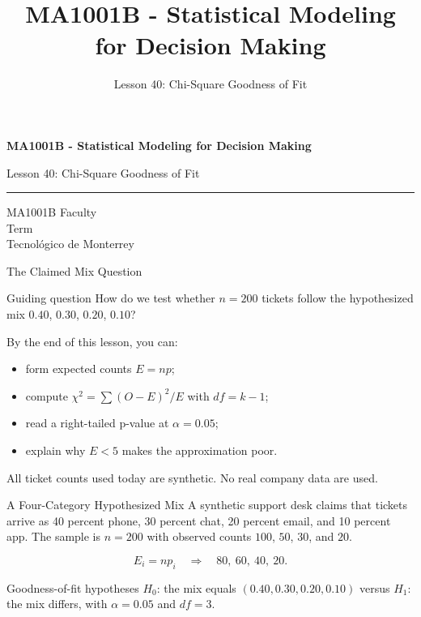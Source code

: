 \documentclass[aspectratio=169,10pt,english]{beamer}
\title{MA1001B - Statistical Modeling for Decision Making}
\subtitle{Lesson 40: Chi-Square Goodness of Fit}
\author{}
\institute{Tecnol\'ogico de Monterrey}
\date{}
\begin{document}
\begin{frame}[plain]
  \vspace{1.2cm}
  {\Large\bfseries MA1001B - Statistical Modeling for Decision Making\par}
  \vspace{0.7cm}
  {\large Lesson 40: Chi-Square Goodness of Fit\par}
  \vspace{0.7cm}
  {\color{TecRojo}\rule{\textwidth}{1.2pt}}
  \vspace{0.8cm}

  MA1001B Faculty\\[0.3cm]
  Term\\[0.3cm]
  Tecnol\'ogico de Monterrey
\end{frame}

\begin{frame}{The Claimed Mix Question}
  \begin{alertblock}{Guiding question}
    How do we test whether $n=200$ tickets follow the hypothesized mix
    $0.40$, $0.30$, $0.20$, $0.10$?
  \end{alertblock}

  \vspace{0.6em}
  By the end of this lesson, you can:
  \begin{itemize}
    \item form expected counts $E=np$;
    \item compute $\chi^2=\sum(O-E)^2/E$ with $df=k-1$;
    \item read a right-tailed p-value at $\alpha=0.05$;
    \item explain why $E<5$ makes the approximation poor.
  \end{itemize}

  \vfill
  \scriptsize All ticket counts used today are synthetic. No real company data are used.
\end{frame}

\begin{frame}{A Four-Category Hypothesized Mix}
  \small
  A synthetic support desk claims that tickets arrive as 40 percent phone,
  30 percent chat, 20 percent email, and 10 percent app. The sample is
  $n=200$ with observed counts $100$, $50$, $30$, and $20$.

  \[
    E_i = np_i \quad\Rightarrow\quad 80,\ 60,\ 40,\ 20.
  \]

  \begin{exampleblock}{Goodness-of-fit hypotheses}
    $H_0$: the mix equals $(0.40,0.30,0.20,0.10)$ versus $H_1$: the mix
    differs, with $\alpha=0.05$ and $df=3$.
  \end{exampleblock}
\end{frame}
\end{document}
